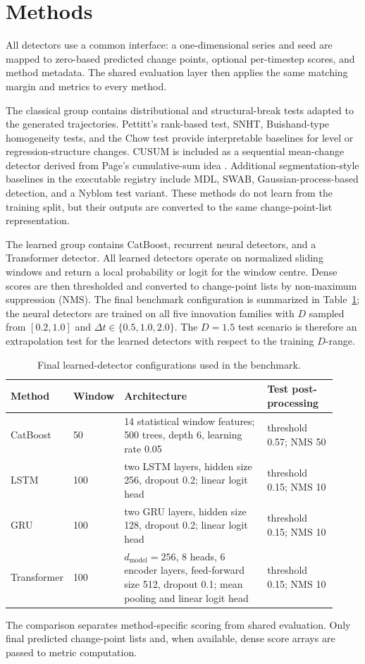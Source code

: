 ﻿\section{Methods}

All detectors use a common interface: a one-dimensional series and seed are
mapped to zero-based predicted change points, optional per-timestep scores, and
method metadata. The shared evaluation layer then applies the same matching
margin and metrics to every method.

The classical group contains distributional and structural-break tests adapted
to the generated trajectories. Pettitt's rank-based test, SNHT, Buishand-type
homogeneity tests, and the Chow test provide interpretable baselines for level
or regression-structure changes. CUSUM is included as a sequential
mean-change detector derived from Page's cumulative-sum idea
\cite{page1954}. Additional segmentation-style baselines in the executable
registry include MDL, SWAB, Gaussian-process-based detection, and a Nyblom
test variant. These methods do not learn from the training split, but their
outputs are converted to the same change-point-list representation.

The learned group contains CatBoost, recurrent neural detectors, and a
Transformer detector. All learned detectors operate on normalized sliding
windows and return a local probability or logit for the window centre. Dense
scores are then thresholded and converted to change-point lists by
non-maximum suppression (NMS). The final benchmark configuration is summarized in
Table~\ref{tab:learned_method_configs}; the neural detectors are trained on
all five innovation families with \(D\) sampled from \([0.2,1.0]\) and
\(\Delta t \in \{0.5,1.0,2.0\}\). The \(D=1.5\) test scenario is therefore an
extrapolation test for the learned detectors with respect to the training
\(D\)-range.

\begin{table}[t]
\centering
\caption{Final learned-detector configurations used in the benchmark.}
\label{tab:learned_method_configs}
\small
\setlength{\tabcolsep}{3pt}
\begin{tabular}{@{}p{0.14\linewidth}p{0.08\linewidth}p{0.48\linewidth}p{0.22\linewidth}@{}}
\toprule
Method & Window & Architecture & Test post-processing \\
\midrule
CatBoost & 50 & 14 statistical window features; 500 trees, depth 6, learning rate 0.05 & threshold 0.57; NMS 50 \\
LSTM & 100 & two LSTM layers, hidden size 256, dropout 0.2; linear logit head & threshold 0.15; NMS 10 \\
GRU & 100 & two GRU layers, hidden size 128, dropout 0.2; linear logit head & threshold 0.15; NMS 10 \\
Transformer & 100 & \(d_{\mathrm{model}}=256\), 8 heads, 6 encoder layers, feed-forward size 512, dropout 0.1; mean pooling and linear logit head & threshold 0.15; NMS 10 \\
\bottomrule
\end{tabular}
\end{table}

The comparison separates method-specific scoring from shared evaluation. Only
final predicted change-point lists and, when available, dense score arrays are
passed to metric computation.

